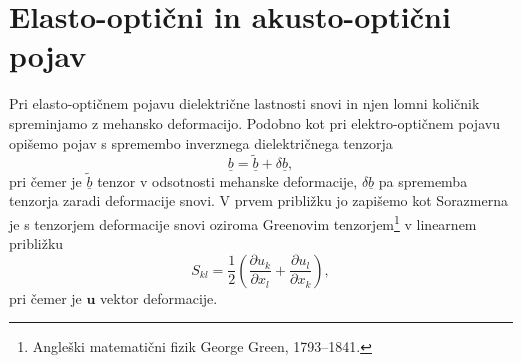 
\section{Elasto-optični in akusto-optični pojav}
Pri elasto-optičnem pojavu dielektrične lastnosti snovi in njen lomni količnik
spreminjamo z mehansko deformacijo. Podobno kot pri elektro-optičnem pojavu opišemo pojav
s spremembo inverznega dielektričnega tenzorja
\begin{equation}
\underline{b} = \underline{\tilde{b}}+ \delta\underline{b},
\end{equation}
pri čemer je $\underline{\tilde{b}}$ tenzor v odsotnosti mehanske deformacije, 
$\delta\underline{b}$ pa sprememba tenzorja zaradi deformacije snovi. V prvem približku jo zapišemo
kot
Sorazmerna je s tenzorjem deformacije snovi oziroma 
Greenovim tenzorjem\footnote{Angleški matematični fizik George Green, 1793--1841.} v
linearnem približku
\begin{equation}
S_{kl}=\frac{1}{2}\left({\frac{\partial u_{k}}{\partial x_{l}}}+{\frac{\partial u_{l}}{\partial x_{k}}}\right),
\label{7.28}
\end{equation}
pri čemer je $\mathbf{u}$ vektor deformacije. 

